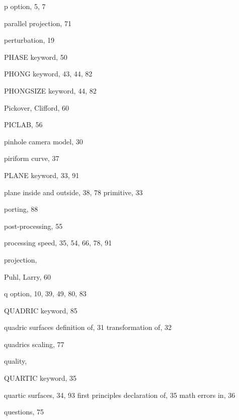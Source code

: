 \begin{theindex}
  \indexspace

  \item {\ptt p} option, 5, 7
  \item parallel projection, 71
  \item perturbation, 19
  \item {\ptt PHASE} keyword, 50
  \item {\ptt PHONG} keyword, 43, 44, 82
  \item {\ptt PHONGSIZE} keyword, 44, 82
  \item Pickover, Clifford, 60
  \item {\ptt PICLAB}, 56
  \item pinhole camera model, 30
  \item piriform curve, 37
  \item {\ptt PLANE} keyword, 33, 91
  \item plane
    \subitem inside and outside, 38, 78
    \subitem primitive, 33
  \item porting, 88
  \item post-processing, 55
  \item processing speed, 35, 54, 66, 78, 91
  \item projection, 
  \item Puhl, Larry, 60

  \indexspace

  \item {\ptt q} option, 10, 39, 49, 80, 83
  \item {\ptt QUADRIC} keyword, 85
  \item quadric surfaces
    \subitem definition of, 31
    \subitem transformation of, 32
  \item quadrics
    \subitem scaling, 77
  \item quality, 
  \item {\ptt QUARTIC} keyword, 35
  \item quartic surfaces, 34, 93
    \subitem first principles declaration of, 35
    \subitem math errors in, 36
  \item questions, 75

  \indexspace


\end{theindex}
